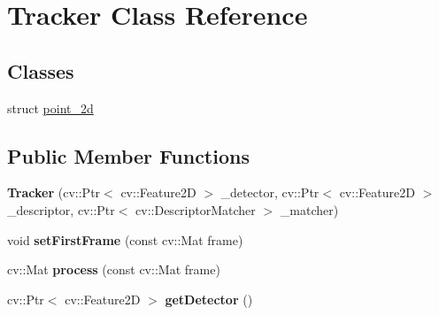 \hypertarget{classTracker}{}\section{Tracker Class Reference}
\label{classTracker}
\subsection*{Classes}
\begin{DoxyCompactItemize}
\item 
struct \hyperlink{structTracker_1_1point__2d}{point\+\_\+2d}
\end{DoxyCompactItemize}
\subsection*{Public Member Functions}
\begin{DoxyCompactItemize}
\item 
{\bfseries Tracker} (cv\+::\+Ptr$<$ cv\+::\+Feature2D $>$ \+\_\+detector, cv\+::\+Ptr$<$ cv\+::\+Feature2D $>$ \+\_\+descriptor, cv\+::\+Ptr$<$ cv\+::\+Descriptor\+Matcher $>$ \+\_\+matcher)\hypertarget{classTracker_af96a2d9f4a4a75ed80debb4168a67771}{}\label{classTracker_af96a2d9f4a4a75ed80debb4168a67771}

\item 
void {\bfseries set\+First\+Frame} (const cv\+::\+Mat frame)\hypertarget{classTracker_a21363f13f0bac8489352f9f19b63c86c}{}\label{classTracker_a21363f13f0bac8489352f9f19b63c86c}

\item 
cv\+::\+Mat {\bfseries process} (const cv\+::\+Mat frame)\hypertarget{classTracker_a0dc06df8de57c18082d3996cd5a34579}{}\label{classTracker_a0dc06df8de57c18082d3996cd5a34579}

\item 
cv\+::\+Ptr$<$ cv\+::\+Feature2D $>$ {\bfseries get\+Detector} ()\hypertarget{classTracker_a55015ab9a5d61d09ab10a06b5b6181ec}{}\label{classTracker_a55015ab9a5d61d09ab10a06b5b6181ec}

\end{DoxyCompactItemize}
